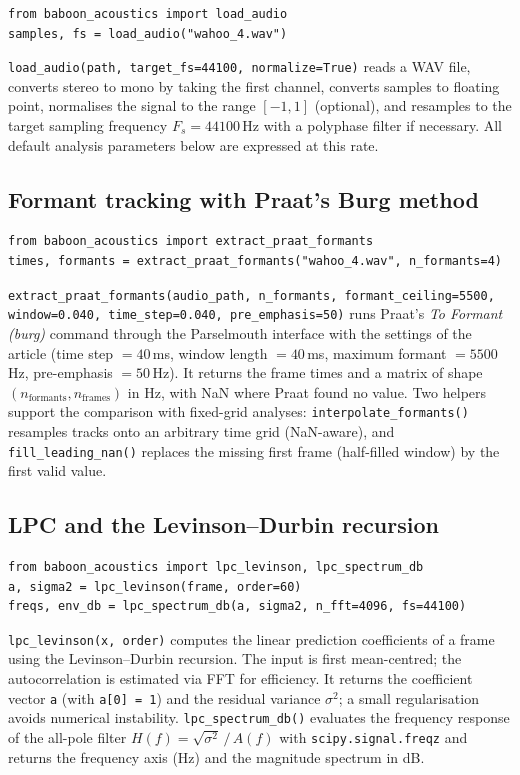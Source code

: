\documentclass[11pt,a4paper]{article}
\newcommand{\file}[1]{\texttt{#1}}
\begin{document}
\begin{lstlisting}
from baboon_acoustics import load_audio
samples, fs = load_audio("wahoo_4.wav")
\end{lstlisting}
\file{load\_audio(path, target\_fs=44100, normalize=True)} reads a WAV
file, converts stereo to mono by taking the first channel, converts
samples to floating point, normalises the signal to the range $[-1, 1]$
(optional), and resamples to the target sampling frequency
$F_s = 44100$\,Hz with a polyphase filter if necessary. All default
analysis parameters below are expressed at this rate.

\subsection{Formant tracking with Praat's Burg method}

\begin{lstlisting}
from baboon_acoustics import extract_praat_formants
times, formants = extract_praat_formants("wahoo_4.wav", n_formants=4)
\end{lstlisting}
\file{extract\_praat\_formants(audio\_path, n\_formants, formant\_ceiling=5500,
window=0.040, time\_step=0.040, pre\_emphasis=50)} runs Praat's
\emph{To Formant (burg)} command through the Parselmouth interface with
the settings of the article (time step $= 40$\,ms, window length $=
40$\,ms, maximum formant $= 5500$\,Hz, pre-emphasis $= 50$\,Hz). It
returns the frame times and a matrix of shape
$(n_{\mathrm{formants}}, n_{\mathrm{frames}})$ in Hz, with NaN where
Praat found no value. Two helpers support the comparison with
fixed-grid analyses: \file{interpolate\_formants()} resamples tracks
onto an arbitrary time grid (NaN-aware), and \file{fill\_leading\_nan()}
replaces the missing first frame (half-filled window) by the first valid
value.

\subsection{LPC and the Levinson--Durbin recursion}

\begin{lstlisting}
from baboon_acoustics import lpc_levinson, lpc_spectrum_db
a, sigma2 = lpc_levinson(frame, order=60)
freqs, env_db = lpc_spectrum_db(a, sigma2, n_fft=4096, fs=44100)
\end{lstlisting}
\file{lpc\_levinson(x, order)} computes the linear prediction
coefficients of a frame using the Levinson--Durbin recursion. The input
is first mean-centred; the autocorrelation is estimated via FFT for
efficiency. It returns the coefficient vector \file{a} (with
\file{a[0] = 1}) and the residual variance $\sigma^2$; a small
regularisation avoids numerical instability.
\file{lpc\_spectrum\_db()} evaluates the frequency response of the
all-pole filter $H(f) = \sqrt{\sigma^2}\,/\,A(f)$ with
\file{scipy.signal.freqz} and returns the frequency axis (Hz) and the
magnitude spectrum in dB.
\end{document}
